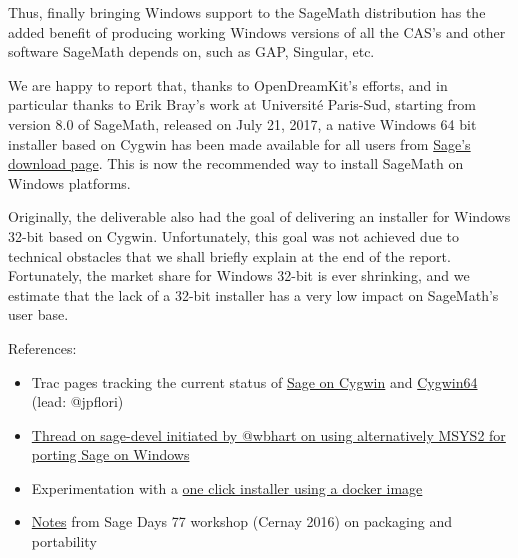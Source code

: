 Thus, finally bringing Windows support to the SageMath distribution
has
the added benefit of producing working Windows versions of all the
CAS's
and other software SageMath depends on, such as GAP, Singular, etc.

We are happy to report that, thanks to OpenDreamKit's efforts, and in
particular thanks to Erik Bray's work at Université Paris-Sud, starting
from
version 8.0 of SageMath, released on July 21, 2017, a native Windows 64
bit
installer based on Cygwin has been made available for all users from
\href{https://www.sagemath.org/download-windows.html}{Sage's download
page}. This is now the recommended way to install SageMath on Windows
platforms.

Originally, the deliverable also had the goal of delivering an
installer
for Windows 32-bit based on Cygwin. Unfortunately, this goal was not
achieved due to technical obstacles that we shall briefly explain at
the end of the report. Fortunately, the market share for Windows
32-bit is ever shrinking, and we estimate that the lack of a 32-bit
installer has a very low impact on SageMath's user base.

References:

\begin{itemize}
\tightlist
\item
  Trac pages tracking the current status of
  \href{http://trac.sagemath.org/wiki/CygwinPort}{Sage on Cygwin} and
  \href{http://trac.sagemath.org/wiki/Cygwin64Port}{Cygwin64} (lead:
  @jpflori)
\item
  \href{https://groups.google.com/d/msg/sage-devel/3tKSfcbhlDM/fWFa-X1WBwAJ}{Thread
  on sage-devel initiated by @wbhart on using alternatively MSYS2 for
  porting Sage on Windows}
\item
  Experimentation with a
  \href{https://github.com/sagemath/docker-images/issues/1}{one click
  installer using a docker image}
\item
  \href{https://wiki.sagemath.org/days77/packaging\#Windows}{Notes} from
  Sage Days 77 workshop (Cernay 2016) on packaging and portability
\end{itemize}

